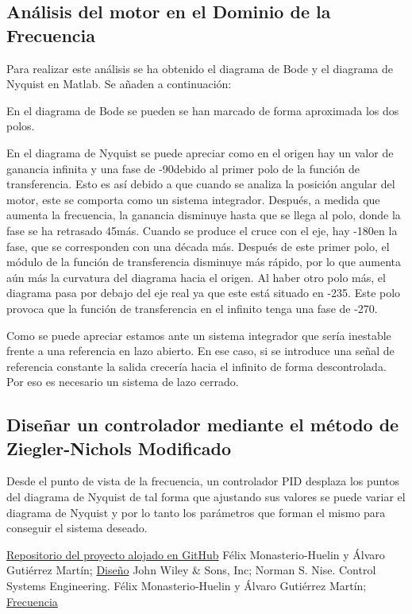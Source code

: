 \documentclass[a4paper]{article}
\begin{document}
\subsection{Análisis del motor en el Dominio de la Frecuencia}
Para realizar este análisis se ha obtenido el diagrama de Bode y el diagrama de Nyquist en Matlab. Se añaden a continuación:

En el diagrama de Bode se pueden se han marcado de forma aproximada los dos polos.

En el diagrama de Nyquist se puede apreciar como en el origen hay un valor de ganancia infinita y una fase de -90\degree debido al primer polo de la función de transferencia. Esto es así debido a que cuando se analiza la posición angular del motor, este se comporta como un sistema integrador. Después, a medida que aumenta la frecuencia, la ganancia disminuye hasta que se llega al polo, donde la fase se ha retrasado 45\degree más. Cuando se produce el cruce con el eje, hay -180\degree en la fase, que se corresponden con una década más. Después de este primer polo, el módulo de la función de transferencia disminuye más rápido, por lo que aumenta aún más la curvatura del diagrama hacia el origen. Al haber otro polo más, el diagrama pasa por debajo del eje real ya que este está situado en -235\degree. Este polo provoca que la función de transferencia en el infinito tenga una fase de -270\degree.

Como se puede apreciar estamos ante un sistema integrador que sería inestable frente a una referencia en lazo abierto. En ese caso, si se introduce una señal de referencia constante la salida crecería hacia el infinito de forma descontrolada. Por eso es necesario un sistema de lazo cerrado.

\subsection{Diseñar un controlador mediante el método de Ziegler-Nichols Modificado}
Desde el punto de vista de la frecuencia, un controlador PID desplaza los puntos del diagrama de Nyquist de tal forma que ajustando sus valores se puede variar el diagrama de Nyquist y por lo tanto los parámetros que forman el mismo para conseguir el sistema deseado.



\begin{thebibliography}{9}
 \href{https://github.com/avicarioe/telelabo}{Repositorio del proyecto alojado en GitHub}
 Félix Monasterio-Huelin y Álvaro Gutiérrez Martín;
\href{http://www.robolabo.etsit.upm.es/asignaturas/seco/apuntes/design.pdf}{Diseño}
 John Wiley \& Sons, Inc; Norman S. Nise. Control Systems Engineering.
 Félix Monasterio-Huelin y Álvaro Gutiérrez Martín;
\href{Félix Monasterio-Huelin y Álvaro Gutiérrez Martín;} {Frecuencia}


\end{thebibliography}
\end{document}
